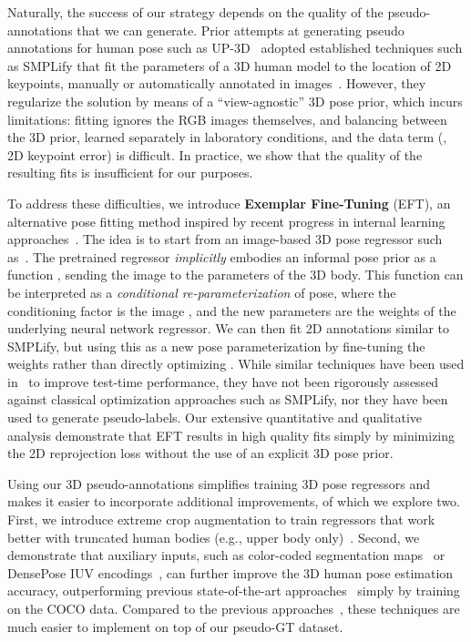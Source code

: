\documentclass[10pt,twocolumn,letterpaper]{article}
\begin{document}
Naturally, the success of our strategy depends on the quality of the pseudo-annotations that we can generate.
	Prior attempts at generating pseudo annotations for human pose such as UP-3D~\cite{Lassner:UP:2017} adopted established techniques such as SMPLify that fit the parameters of a 3D human model to the location of 2D keypoints, manually or automatically annotated in images~\cite{Bogo2016, joo2018, pavlakos19expressive}.
However, they regularize the solution by means of a ``view-agnostic'' 3D pose prior, which incurs limitations:
	fitting ignores the RGB images themselves, and balancing between the 3D prior, learned separately in laboratory conditions, and the data term (\eg, 2D keypoint error) is difficult.
	In practice, we show that the quality of the resulting fits is insufficient for our purposes.
	
To address these difficulties, we introduce \textbf{Exemplar Fine-Tuning} (EFT), an alternative pose fitting method inspired by recent progress in internal learning approaches~\cite{ulyanov18deep,zhang19an-internal,gadelha20deep}.
	The idea is to start from an image-based 3D pose regressor such as~\cite{Tung2017,kanazawa2018end,kolotouros2019spin}.
	The pretrained regressor \emph{implicitly} embodies an informal pose prior
as a function , sending the image  to the parameters  of the 3D body.
	This function can be interpreted as a \emph{conditional re-parameterization} of pose, where the conditioning factor is the image , and the new parameters are the weights  of the underlying neural network regressor.
	We can then fit 2D annotations similar to SMPLify, but using this as a new pose parameterization by fine-tuning the weights  rather than directly optimizing .
	While similar techniques have been used in~\cite{Tung2017,alldieck2019learning,Zuffi:ICCV:2019} to improve test-time performance, they have not been rigorously assessed against classical optimization approaches such as SMPLify, nor they have been used to generate pseudo-labels.
	Our extensive quantitative and qualitative analysis demonstrate that EFT results in high quality fits simply by minimizing the 2D reprojection loss without the use of an explicit 3D pose prior.
	
Using our 3D pseudo-annotations simplifies training 3D pose regressors and makes it easier to incorporate additional improvements, of which we explore two.
	First, we introduce extreme crop augmentation to train regressors that work better with truncated human bodies (e.g., upper body only)~\cite{Rockwell2020}.
	Second, we demonstrate that auxiliary inputs, such as color-coded segmentation maps~\cite{kirillov2019panoptic,kirillov2020pointrend} or DensePose IUV encodings~\cite{guler2018densepose}, can further improve the 3D human pose estimation accuracy, outperforming previous state-of-the-art approaches~\cite{kanazawa2018end,sun2019human,kolotouros2019spin,choi2020pose2mesh, moon2020i2l} simply by training on the COCO data.
	Compared to the previous approaches~\cite{Rockwell2020,rong2019delving, xu2019denserac, omran18neural}, these techniques are much easier to implement on top of our pseudo-GT dataset.
	
\end{document}
